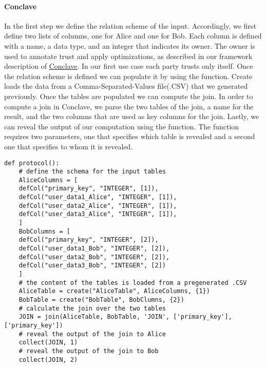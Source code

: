 \paragraph{Conclave} 
In the first step we define the relation scheme of the input. Accordingly, we first define two lists of columns, one for Alice and one for Bob. Each column is defined with a name, a data type, and an integer that indicates its owner. The owner is used to annotate trust and apply optimizations, as described in our framework description of \hyperref[Trust_label]{Conclave}. In our first use case each party trusts only itself. Once the relation scheme is defined we can populate it by using the  function. Create loads the data from a  Comma-Separated-Values file(.CSV) that we generated previously. Once the tables are populated we can compute the join. In order to compute a join in Conclave, we parse the two tables of the join, a name for the result, and the two columns that are used as key columns for the join. 
Lastly, we can reveal the output of our computation using the  function. The  function requires two parameters, one that specifies which table is revealed and a second one that specifies to whom it is revealed.
\begin{lstlisting}[caption={ The Python protocol of Conclave for our first use case    }]
def protocol():
	# define the schema for the input tables 
	AliceColumns = [
	defCol("primary_key", "INTEGER", [1]),
	defCol("user_data1_Alice", "INTEGER", [1]),
	defCol("user_data2_Alice", "INTEGER", [1]),
	defCol("user_data3_Alice", "INTEGER", [1]),
	]
	BobColumns = [
	defCol("primary_key", "INTEGER", [2]),
	defCol("user_data1_Bob", "INTEGER", [2]),
	defCol("user_data2_Bob", "INTEGER", [2]),
	defCol("user_data3_Bob", "INTEGER", [2])
	]
	# the content of the tables is loaded from a pregenerated .CSV
	AliceTable = create("AliceTable", AliceColumns, {1})
	BobTable = create("BobTable", BobClumns, {2})
	# calculate the join over the two tables 
	JOIN = join(AliceTable, BobTable, 'JOIN', ['primary_key'], ['primary_key'])
	# reveal the output of the join to Alice
	collect(JOIN, 1)
	# reveal the output of the join to Bob
	collect(JOIN, 2)
\end{lstlisting}

